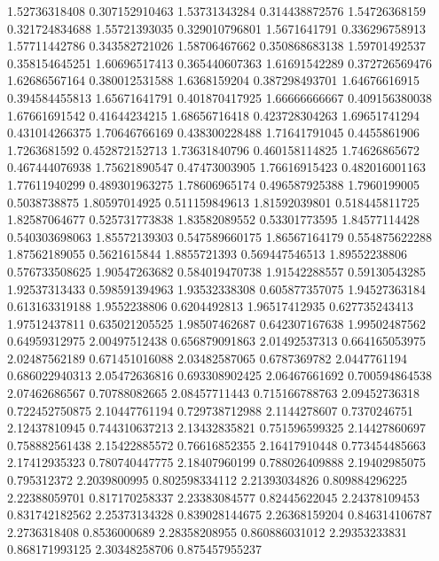  1.52736318408   0.307152910463
  1.53731343284   0.314438872576
  1.54726368159   0.321724834688
  1.55721393035   0.329010796801
   1.5671641791   0.336296758913
  1.57711442786   0.343582721026
  1.58706467662   0.350868683138
  1.59701492537   0.358154645251
  1.60696517413   0.365440607363
  1.61691542289   0.372726569476
  1.62686567164   0.380012531588
   1.6368159204   0.387298493701
  1.64676616915   0.394584455813
  1.65671641791   0.401870417925
  1.66666666667   0.409156380038
  1.67661691542    0.41644234215
  1.68656716418   0.423728304263
  1.69651741294   0.431014266375
  1.70646766169   0.438300228488
  1.71641791045     0.4455861906
   1.7263681592   0.452872152713
  1.73631840796   0.460158114825
  1.74626865672   0.467444076938
  1.75621890547    0.47473003905
  1.76616915423   0.482016001163
  1.77611940299   0.489301963275
  1.78606965174   0.496587925388
   1.7960199005     0.5038738875
  1.80597014925   0.511159849613
  1.81592039801   0.518445811725
  1.82587064677   0.525731773838
  1.83582089552    0.53301773595
  1.84577114428   0.540303698063
  1.85572139303   0.547589660175
  1.86567164179   0.554875622288
  1.87562189055     0.5621615844
   1.8855721393   0.569447546513
  1.89552238806   0.576733508625
  1.90547263682   0.584019470738
  1.91542288557    0.59130543285
  1.92537313433   0.598591394963
  1.93532338308   0.605877357075
  1.94527363184   0.613163319188
   1.9552238806     0.6204492813
  1.96517412935   0.627735243413
  1.97512437811   0.635021205525
  1.98507462687   0.642307167638
  1.99502487562    0.64959312975
  2.00497512438   0.656879091863
  2.01492537313   0.664165053975
  2.02487562189   0.671451016088
  2.03482587065     0.6787369782
   2.0447761194   0.686022940313
  2.05472636816   0.693308902425
  2.06467661692   0.700594864538
  2.07462686567    0.70788082665
  2.08457711443   0.715166788763
  2.09452736318   0.722452750875
  2.10447761194   0.729738712988
   2.1144278607     0.7370246751
  2.12437810945   0.744310637213
  2.13432835821   0.751596599325
  2.14427860697   0.758882561438
  2.15422885572    0.76616852355
  2.16417910448   0.773454485663
  2.17412935323   0.780740447775
  2.18407960199   0.788026409888
  2.19402985075      0.795312372
   2.2039800995   0.802598334112
  2.21393034826   0.809884296225
  2.22388059701   0.817170258337
  2.23383084577    0.82445622045
  2.24378109453   0.831742182562
  2.25373134328   0.839028144675
  2.26368159204   0.846314106787
   2.2736318408     0.8536000689
  2.28358208955   0.860886031012
  2.29353233831   0.868171993125
  2.30348258706   0.875457955237
